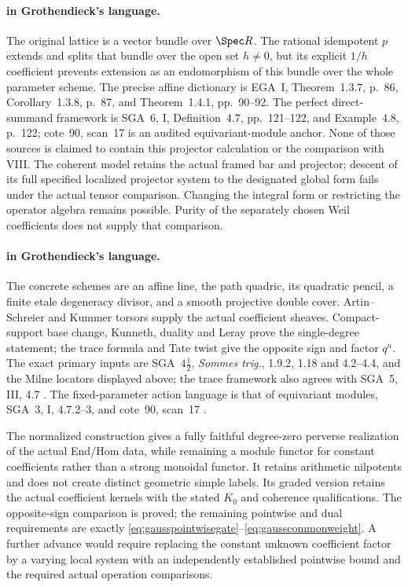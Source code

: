 \paragraph{ in Grothendieck's language.}
The original lattice is a vector bundle over $\Spec R$.
The rational idempotent $p$ extends and splits that bundle
over the open set $h\ne0$, but its explicit $1/h$ coefficient
prevents extension as an endomorphism of this bundle over
the whole parameter scheme. The precise affine dictionary is
EGA~I, Theorem~1.3.7, p.~86, Corollary~1.3.8, p.~87, and
Theorem~1.4.1, pp.~90--92.
The perfect direct-summand framework is SGA~6, I,
Definition~4.7, pp.~121--122, and Example~4.8, p.~122;
cote~90, scan~17 is an audited equivariant-module anchor.
None of those sources is claimed to contain this projector
calculation or the comparison with VIII.
The coherent model retains the actual framed bar and projector;
descent of its full specified localized projector system to
the designated global form fails under the actual tensor
comparison. Changing the integral form or restricting the
operator algebra remains possible. Purity of the separately
chosen Weil coefficients does not supply that comparison.


\paragraph{ in Grothendieck's language.}
The concrete schemes are an affine line, the path quadric,
its quadratic pencil, a finite etale degeneracy divisor,
and a smooth projective double cover. Artin--Schreier
and Kummer torsors supply the actual coefficient sheaves.
Compact-support base change, Kunneth, duality and Leray
prove the single-degree statement; the trace formula and
Tate twist give the opposite sign and factor $q^n$.
The exact primary inputs are SGA~$4\frac12$,
\emph{Sommes trig.}, 1.9.2, 1.18 and 4.2--4.4, and
the Milne locators displayed above; the trace framework
also agrees with SGA~5, III, 4.7 \cite{SGA45,Milne,SGA5}.
The fixed-parameter action language is that of equivariant
modules, SGA~3, I, 4.7.2--3, and cote~90, scan~17
\cite{SGA3,Archive}.

The normalized construction gives a fully faithful
degree-zero perverse realization of the actual
 End/Hom data, while remaining a module functor
for constant coefficients rather than a strong monoidal
functor. It retains arithmetic nilpotents and does not
create distinct geometric simple labels. Its graded
version retains the actual  coefficient kernels
with the stated $K_0$ and coherence qualifications.
The opposite-sign comparison is proved; the remaining
pointwise and dual requirements are exactly
\eqref{eq:gausspointwisegate}--\eqref{eq:gausscommonweight}.
A further advance would require replacing the constant
unknown coefficient factor by a varying local system
with an independently established pointwise bound and
the required actual operation comparisons.


